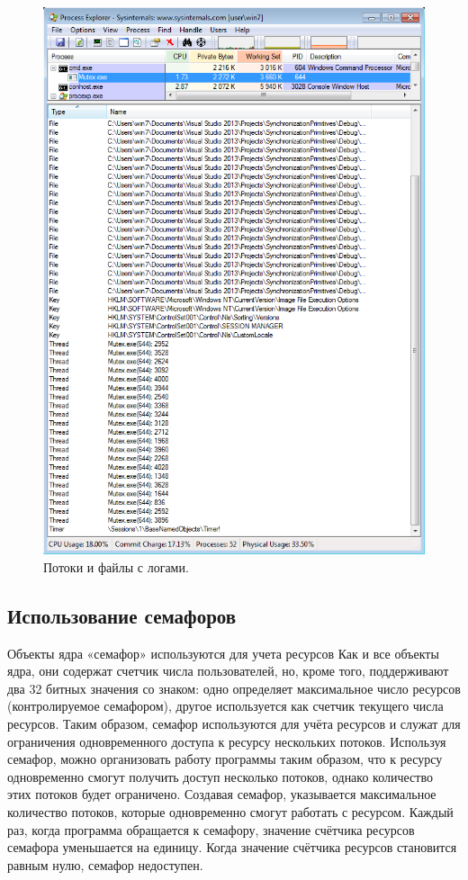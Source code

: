 \documentclass[a4paper, 12pt]{article}		%
\begin{document}
\begin{figure}[h!]
\centering
\includegraphics[scale=0.65]{res/pe_01}
\caption{Потоки и файлы с логами.}
\end{figure}


\newpage
\subsection{Использование семафоров}

Объекты ядра «семафор» используются для учета ресурсов Как и все объекты ядра, они содержат счетчик числа пользователей, но, кроме того, поддерживают два 32 битных значения со знаком: одно определяет максимальное число ресурсов (контролируемое семафором), другое используется как счетчик текущего числа ресурсов. Таким образом, семафор используются для учёта ресурсов и служат для ограничения одновременного доступа к ресурсу нескольких потоков. Используя семафор, можно организовать работу программы таким образом, что к ресурсу одновременно смогут получить доступ несколько потоков, однако количество этих потоков будет ограничено. Создавая семафор, указывается максимальное количество потоков, которые одновременно смогут работать с ресурсом. Каждый раз, когда программа обращается к семафору, значение счётчика ресурсов семафора уменьшается на единицу. Когда значение счётчика ресурсов становится равным нулю, семафор недоступен.
\end{document}
